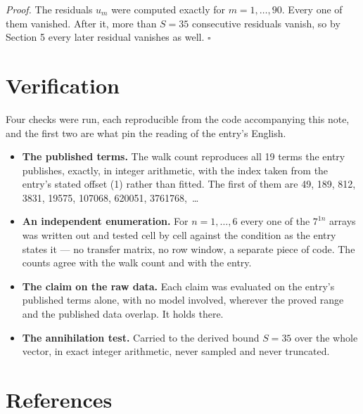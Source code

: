 \documentclass[11pt]{article}
\theoremstyle{definition}
\begin{document}
{\itshape Proof.} The residuals $u_m$ were computed exactly for $m = 1,\dots,90$. Every one of them vanished. After it, more than $S = 35$ consecutive residuals vanish, so by Section 5 every later residual vanishes as well. $\square$

\section{Verification}

Four checks were run, each reproducible from the code accompanying this note, and the first two are what pin the reading of the entry's English.

\begin{itemize}

\item {\bfseries The published terms.} The walk count reproduces all 19 terms the entry publishes, exactly, in integer arithmetic, with the index taken from the entry's stated offset (1) rather than fitted. The first of them are 49, 189, 812, 3831, 19575, 107068, 620051, 3761768,~\dots

\item {\bfseries An independent enumeration.} For $n = 1,\dots,6$ every one of the $7^{1n}$ arrays was written out and tested cell by cell against the condition as the entry states it --- no transfer matrix, no row window, a separate piece of code. The counts agree with the walk count and with the entry.

\item {\bfseries The claim on the raw data.} Each claim was evaluated on the entry's published terms alone, with no model involved, wherever the proved range and the published data overlap. It holds there.

\item {\bfseries The annihilation test.} Carried to the derived bound $S = 35$ over the whole vector, in exact integer arithmetic, never sampled and never truncated.

\end{itemize}

\section{References}
\end{document}
